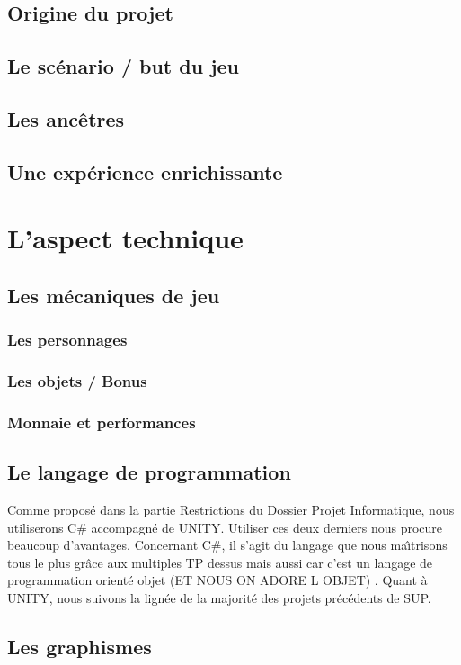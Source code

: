 \documentclass[12pt]{report}
\begin{document}
    \section{Origine du projet}
    \section{Le scénario / but du jeu}
    \section{Les ancêtres}
    \section{Une expérience enrichissante}

\chapter{L'aspect technique} 
    \section{Les mécaniques de jeu}
        \subsection{Les personnages}
        \subsection{Les objets / Bonus}
        \subsection{Monnaie et performances}
    \section{Le langage de programmation}

Comme proposé dans la partie Restrictions du Dossier Projet Informatique, nous utiliserons C# accompagné de UNITY.
Utiliser ces deux derniers nous procure beaucoup d’avantages. Concernant
C#, il s’agit du langage que nous maı̂trisons tous le plus grâce aux multiples
TP dessus mais aussi car c'est un langage de programmation orienté objet (ET NOUS ON ADORE L OBJET) . 
Quant à UNITY, nous suivons la lignée de la majorité des projets précédents
de SUP. 
    \section{Les graphismes}
\end{document}
